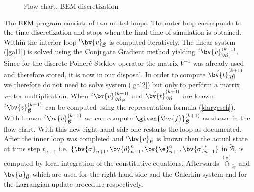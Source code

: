 \begin{small}
\begin{figure}[h!]
\begin{psmatrix}[rowsep=0.4,colsep=-0.5]
\end{psmatrix}
\parbox{12.5cm}{\caption{\label{fl1}Flow chart. BEM discretization}}
\end{figure}    %
\end{small}


The BEM program consists of two nested loops. The outer loop corresponds to the time discretization and stops when the final time of simulation is obtained. Within the interior loop ${}^{t}\bv{v}_{\tilde{\mathcal{B}}}$ is computed iteratively. The linear system (\ref{gal1}) is solved using the  Conjugate Gradient method yielding ${}^{t}\bv{v}^{(k+1)}_{\partial \tilde{\mathcal{B}}_t}$. Since for the discrete Poincr\'e-Steklov operator the matrix $V^{-1}$ was already used and therefore stored, it is now in our disposal. In order to compute $\hat{\bv{t}}^{(k+1)}_{\partial \tilde{\mathcal{B}}}$ we therefore  do not need to solve system  (\ref{gal2}) but only to perform a matrix vector multiplication. When ${}^{t}\bv{v}^{(k+1)}_{\partial \tilde{\mathcal{B}}_N}$ and $\hat{\bv{t}}^{(k+1)}_{\partial \tilde{\mathcal{B}}}$ are known  ${}^{t}\bv{v}^{(k+1)}_{\tilde{\mathcal{B}}}$ can be computed using the representation formula (\ref{dargesch}). With known ${}^{t}\bv{v}^{(k+1)}_{\tilde{\mathcal{B}}}$ we can compute $\given{\bv{f}}^{(k+1)}_{\tilde{\mathcal{B}}}$ as shown in the flow chart. With this new right hand side one restarts the loop as documented. After the inner loop was completed and ${}^{t}\bv{v}_{\tilde{\mathcal{B}}}$ is known then the actual state  at time step $t_{n+1}$ i.e. $\{\bv{\sigma}_{n+1},\bv{d}^n_{n+1},\bv{\e}^a_{n+1},\bv{\sigma}^{*}_{n+1}\}$ in $\tilde{\mathcal{B}}$, is computed by local integration of the constitutive equations. Afterwards $\stackrel{(\star)}{\mathbb{G}}_{\tilde{\mathcal{B}}}$ and $\bv{u}_{\tilde{\mathcal{B}}}$ which are used for the right hand side and the Galerkin system and for the Lagrangian update procedure respectively. 

